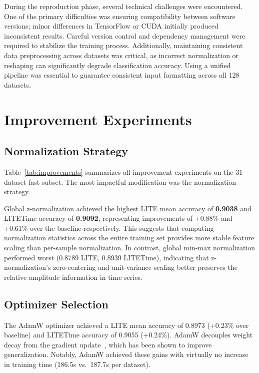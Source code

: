 \documentclass[conference]{IEEEtran}
\begin{document}
During the reproduction phase, several technical challenges were encountered. One of the primary difficulties was ensuring compatibility between software versions; minor differences in TensorFlow or CUDA initially produced inconsistent results. Careful version control and dependency management were required to stabilize the training process. Additionally, maintaining consistent data preprocessing across datasets was critical, as incorrect normalization or reshaping can significantly degrade classification accuracy. Using a unified pipeline was essential to guarantee consistent input formatting across all 128 datasets.

\section{Improvement Experiments}

\subsection{Normalization Strategy}

Table~\ref{tab:improvements} summarizes all improvement experiments on the 31-dataset fast subset. The most impactful modification was the normalization strategy.

Global z-normalization achieved the highest LITE mean accuracy of \textbf{0.9038} and LITETime accuracy of \textbf{0.9092}, representing improvements of +0.88\% and +0.61\% over the baseline respectively. This suggests that computing normalization statistics across the entire training set provides more stable feature scaling than per-sample normalization. In contrast, global min-max normalization performed worst (0.8789 LITE, 0.8939 LITETime), indicating that z-normalization's zero-centering and unit-variance scaling better preserves the relative amplitude information in time series.

\subsection{Optimizer Selection}

The AdamW optimizer achieved a LITE mean accuracy of 0.8973 (+0.23\% over baseline) and LITETime accuracy of 0.9055 (+0.24\%). AdamW decouples weight decay from the gradient update~\cite{loshchilov2019adamw}, which has been shown to improve generalization. Notably, AdamW achieved these gains with virtually no increase in training time (186.5s vs.\ 187.7s per dataset).
\end{document}
